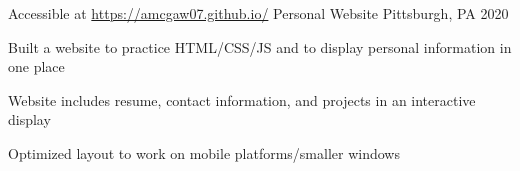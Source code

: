 \documentclass[]{awesome-cv}
\begin{document}
\begin{cventries}
	\cventry
	{Accessible at \href{https://amcgaw07.github.io/} {https://amcgaw07.github.io/}}
	{Personal Website}
	{Pittsburgh, PA}
	{2020}
	{\begin{cvitems}
		\item {Built a website to practice HTML/CSS/JS and to display personal information in one place}
		\item {Website includes resume, contact information, and projects in an interactive display}
		\item {Optimized layout to work on mobile platforms/smaller windows}
		\end{cvitems}}

	

\end{cventries}
\end{document}

